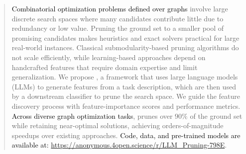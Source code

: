 \begin{abstract}



\textcolor{black}{Combinatorial optimization problems defined over graphs} involve large discrete search spaces where many candidates contribute little due to redundancy or low value. Pruning the ground set to a smaller pool of promising candidates makes heuristics and exact solvers practical for large real-world instances.  Classical submodularity-based pruning algorithms do not scale efficiently, while learning-based approaches depend on handcrafted features that require domain expertise and limit generalization. We propose \llm, a framework that uses large language models (LLMs) to generate features from a task description, which are then used by a downstream classifier to prune the search space. We guide the feature discovery process with feature-importance scores and performance metrics. \textcolor{black}{Across diverse graph optimization tasks}, \llm prunes over $90\%$ of the ground set while retaining near-optimal solutions, achieving orders-of-magnitude speedups over existing approaches. \textcolor{black}{Code, data, and pre-trained models are
available at: \url{https://anonymous.4open.science/r/LLM_Pruning-798E}}.

\end{abstract}
